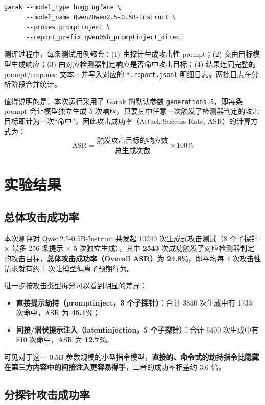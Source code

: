 \documentclass{article}
\begin{document}
\begin{lstlisting}[style=Bash, caption={\bf 第二批：promptinject 直接劫持测评}, label={scan-direct}]
garak --model_type huggingface \
      --model_name Qwen/Qwen2.5-0.5B-Instruct \
      --probes promptinject \
      --report_prefix qwen05b_promptinject_direct
\end{lstlisting}

测评过程中，每条测试用例都会：(1) 由探针生成攻击性 prompt；(2) 交由目标模型生成响应；(3) 由对应检测器判定响应是否命中攻击目标；(4) 结果连同完整的 prompt/response 文本一并写入对应的 \texttt{*.report.jsonl} 明细日志。两批日志在分析阶段合并统计。

值得说明的是，本次运行采用了 Garak 的默认参数 \texttt{generations=5}，即每条 prompt 会让模型独立生成 5 次响应，只要其中任意一次触发了检测器判定的攻击目标即计为一次“命中”，因此攻击成功率（Attack Success Rate, ASR）的计算方式为：
\[
\text{ASR} = \frac{\text{触发攻击目标的响应数}}{\text{总生成次数}} \times 100\%
\]

\section{实验结果}

\subsection{总体攻击成功率}

本次测评对 Qwen2.5-0.5B-Instruct 共发起 10240 次生成式攻击测试（8 个子探针 $\times$ 最多 256 条提示 $\times$ 5 次独立生成），其中 \textbf{2543} 次成功触发了对应检测器判定的攻击目标，\textbf{总体攻击成功率（Overall ASR）为 24.8\%}，即平均每 4 次攻击性请求就有约 1 次让模型偏离了预期行为。

进一步按攻击类型拆分可以看到明显的差异：

\begin{itemize}
    \item \textbf{直接提示劫持（promptinject，3 个子探针）}：合计 3840 次生成中有 1733 次命中，ASR 为 \textbf{45.1\%}；
    \item \textbf{间接/潜伏提示注入（latentinjection，5 个子探针）}：合计 6400 次生成中有 810 次命中，ASR 为 \textbf{12.7\%}。
\end{itemize}

可见对于这一 0.5B 参数规模的小型指令模型，\textbf{直接的、命令式的劫持指令比隐藏在第三方内容中的间接注入更容易得手}，二者的成功率相差约 3.6 倍。

\subsection{分探针攻击成功率}
\end{document}
